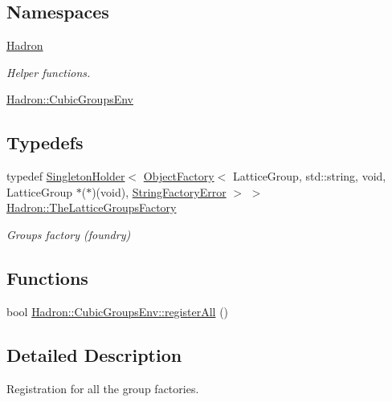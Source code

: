 \subsection*{Namespaces}
\begin{DoxyCompactItemize}
\item 
 \mbox{\hyperlink{namespaceHadron}{Hadron}}
\begin{DoxyCompactList}\small\item\em Helper functions. \end{DoxyCompactList}\item 
 \mbox{\hyperlink{namespaceHadron_1_1CubicGroupsEnv}{Hadron\+::\+Cubic\+Groups\+Env}}
\end{DoxyCompactItemize}
\subsection*{Typedefs}
\begin{DoxyCompactItemize}
\item 
typedef \mbox{\hyperlink{classUtil_1_1SingletonHolder}{Singleton\+Holder}}$<$ \mbox{\hyperlink{classUtil_1_1ObjectFactory}{Object\+Factory}}$<$ Lattice\+Group, std\+::string, void, Lattice\+Group $\ast$($\ast$)(void), \mbox{\hyperlink{structUtil_1_1StringFactoryError}{String\+Factory\+Error}} $>$ $>$ \mbox{\hyperlink{namespaceHadron_a02f5300bae0fd0f2966756ba9c021b49}{Hadron\+::\+The\+Lattice\+Groups\+Factory}}
\begin{DoxyCompactList}\small\item\em Groups factory (foundry) \end{DoxyCompactList}\end{DoxyCompactItemize}
\subsection*{Functions}
\begin{DoxyCompactItemize}
\item 
bool \mbox{\hyperlink{namespaceHadron_1_1CubicGroupsEnv_a72c88213059f1ce4ac24ef0b5032307b}{Hadron\+::\+Cubic\+Groups\+Env\+::register\+All}} ()
\end{DoxyCompactItemize}


\subsection{Detailed Description}
Registration for all the group factories. 

